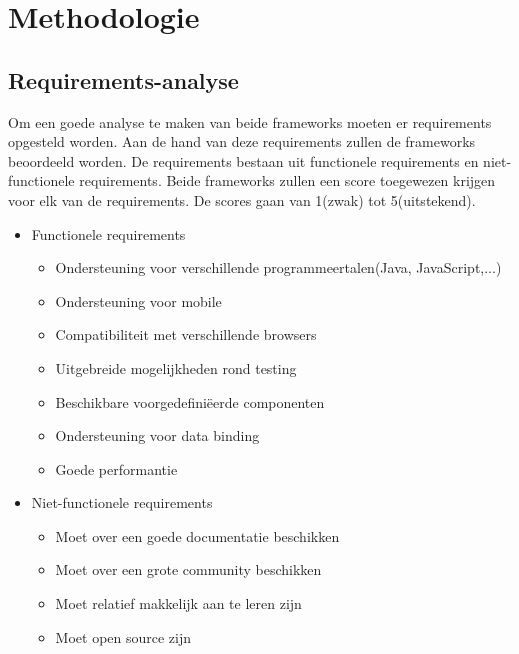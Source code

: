 
\chapter{Methodologie}
\label{ch:methodologie}


\section{Requirements-analyse}
Om een goede analyse te maken van beide frameworks moeten er requirements opgesteld worden. Aan de hand van deze requirements zullen de frameworks beoordeeld worden. De requirements bestaan uit functionele requirements en niet-functionele requirements. Beide frameworks zullen een score toegewezen krijgen voor elk van de requirements. De scores gaan van 1(zwak) tot 5(uitstekend).

\begin{itemize}
\item  Functionele requirements 
\begin{itemize}
	\item Ondersteuning voor verschillende programmeertalen(Java, JavaScript,...)
	\item Ondersteuning voor mobile
	\item Compatibiliteit met verschillende browsers
	\item Uitgebreide mogelijkheden rond testing
	\item Beschikbare voorgedefiniëerde componenten 
	\item Ondersteuning voor data binding
	\item Goede performantie
\end{itemize}

\item Niet-functionele requirements
\begin{itemize}
	\item Moet over een goede documentatie beschikken
	\item Moet over een grote community beschikken
	\item Moet relatief makkelijk aan te leren zijn 
	\item Moet open source zijn	
\end{itemize}
\end{itemize}

